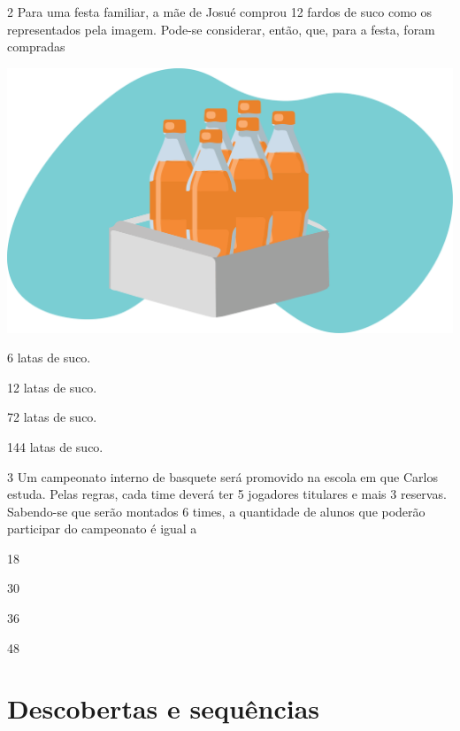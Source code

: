 \num{2} Para uma festa familiar, a mãe de Josué comprou 12 fardos de
suco como os representados pela imagem. Pode-se considerar, então, que, para a festa, foram compradas


\begin{minipage}{.5\textwidth}
\includegraphics[width=\textwidth]{./media/image26.png}
\end{minipage}
\begin{minipage}{.5\textwidth}
\begin{escolha}
\item
  6 latas de suco.
\item
  12 latas de suco.
\item
  72 latas de suco.
\item
  144 latas de suco.
\end{escolha}
\end{minipage}

\num{3} Um campeonato interno de basquete será promovido na escola em que Carlos
estuda. Pelas regras, cada time deverá ter 5 jogadores titulares e mais 3 reservas. Sabendo-se que serão montados 6 times, a quantidade de alunos
que poderão participar do campeonato é igual a

\begin{escolha}
\item
  18
\item
  30
\item
  36
\item
  48
\end{escolha}

\chapter{Descobertas e sequências}
\enlargethispage{\baselineskip}

